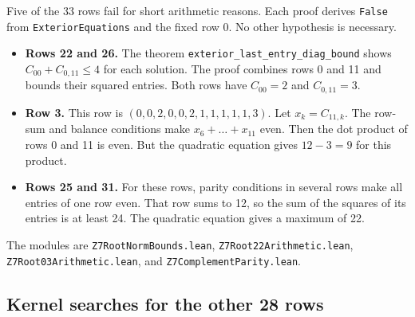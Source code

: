 \documentclass[pdflatex,sn-mathphys-num]{sn-jnl}
\theoremstyle{thmstyleone}
\theoremstyle{thmstyletwo}
\theoremstyle{thmstylethree}
\numberwithin{equation}{section}
\begin{document}
Five of the 33 rows fail for short arithmetic reasons. Each proof derives \texttt{False} from \texttt{ExteriorEquations} and the fixed row 0. No other hypothesis is necessary.
\begin{itemize}
 \item \textbf{Rows 22 and 26.} The theorem \texttt{exterior\_last\_entry\_diag\_bound} shows $C_{00} + C_{0,11} \le 4$ for each solution. The proof combines rows 0 and 11 and bounds their squared entries. Both rows have $C_{00} = 2$ and $C_{0,11} = 3$.
 \item \textbf{Row 3.} This row is $(0,0,2,0,0,2,1,1,1,1,1,3)$. Let $x_k = C_{11,k}$. The row-sum and balance conditions make $x_6 + \dots + x_{11}$ even. Then the dot product of rows 0 and 11 is even. But the quadratic equation gives $12 - 3 = 9$ for this product.
 \item \textbf{Rows 25 and 31.} For these rows, parity conditions in several rows make all entries of one row even. That row sums to 12, so the sum of the squares of its entries is at least 24. The quadratic equation gives a maximum of 22.
\end{itemize}
The modules are \texttt{Z7RootNormBounds.lean}, \texttt{Z7Root22Arithmetic.lean}, \texttt{Z7Root03Arithmetic.lean}, and \texttt{Z7ComplementParity.lean}.

\subsection{Kernel searches for the other 28 rows}
\end{document}
